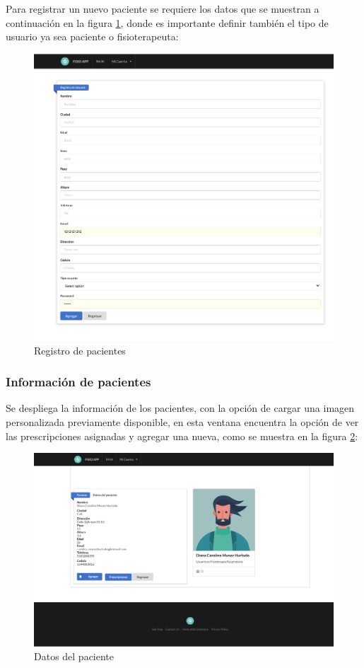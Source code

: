 \documentclass[12pt]{article}
\begin{document}
Para registrar un nuevo paciente se requiere los datos que se muestran a continuación en la figura \ref{35}, donde es importante definir también el tipo de usuario ya sea paciente o fisioterapeuta:

\begin{figure}[ht]
\centering
\includegraphics[scale=0.5]{imag/appregistrousuario.png}
\caption{Registro de pacientes}
\label{35}
\end{figure}
\FloatBarrier

\subsubsection{Información de pacientes}

Se despliega la información de los pacientes, con la opción de cargar una imagen personalizada previamente disponible, en esta ventana encuentra la opción de ver las prescripciones asignadas y agregar una nueva, como se muestra en la figura \ref{36}:


\begin{figure}[ht]
\centering
\includegraphics[scale=0.3]{imag/appverdatosusuarios2.png}
\caption{Datos del paciente}
\label{36}
\end{figure}
\FloatBarrier
\end{document}
